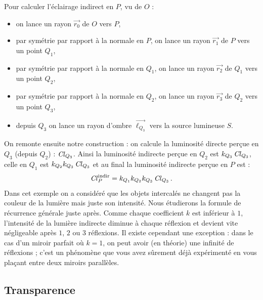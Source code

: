 \documentclass[11pt,class=report,crop=false]{standalone}
\begin{document}
Pour calculer l'éclairage indirect en $P$, vu de $O$ :
\begin{itemize}
	\item on lance un rayon $\vec{r_0}$ de $O$ vers $P$,
	\item par symétrie par rapport à la normale en $P$, on lance un rayon $\vec{r_1}$ de $P$ vers un point $Q_1$,
	\item par symétrie par rapport à la normale en $Q_1$, on lance un rayon $\vec{r_2}$ de $Q_1$ vers un point $Q_2$,
	\item par symétrie par rapport à la normale en $Q_2$, on lance un rayon $\vec{r_3}$ de $Q_2$ vers un point $Q_3$,
	\item depuis $Q_3$ on lance un rayon d'ombre $\vec{\ell_{Q_3}}$ vers la source lumineuse $S$.
\end{itemize}			
On remonte ensuite notre construction : on calcule la luminosité directe perçue en $Q_3$ (depuis $Q_2$) : $\operatorname{\it Cl}_{Q_3}$. Ainsi la luminosité indirecte perçue en $Q_2$ est $k_{Q_3}\operatorname{\it Cl}_{Q_3}$, celle en $Q_1$ est $k_{Q_2}k_{Q_3}\operatorname{\it Cl}_{Q_3}$ et au final la luminosité indirecte perçue en $P$ est :
$$\operatorname{\it Cl}^{\text{indir}}_{P} = k_{Q_1}k_{Q_2}k_{Q_3}\operatorname{\it Cl}_{Q_3}.$$
Dans cet exemple on a considéré que les objets intercalés ne changent pas la couleur de la lumière mais juste son intensité.
Nous étudierons la formule de récurrence générale juste après.
Comme chaque coefficient $k$ est inférieur à $1$, l'intensité de la lumière indirecte diminue à chaque réflexion et devient vite négligeable après $1$, $2$ ou $3$ réflexions.
Il existe cependant une exception : dans le cas d'un miroir parfait où $k=1$, on peut avoir (en théorie) une infinité de réflexions ; c'est un phénomène que vous avez sûrement déjà expérimenté en vous plaçant entre deux miroirs parallèles.


\subsection{Transparence}

\end{document}

